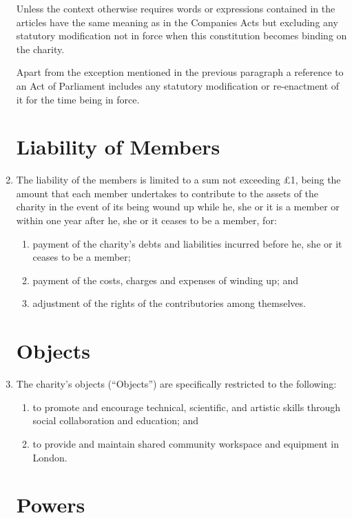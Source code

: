 \begin{enumerate}
  Unless the context otherwise requires words or expressions
  contained in the articles have the same meaning as in the Companies
  Acts but excluding any statutory modification not in force when
  this constitution becomes binding on the charity.

  Apart from the exception mentioned in the previous paragraph a
  reference to an Act of Parliament includes any statutory
  modification or re-enactment of it for the time being in force.

\section{Liability of Members}

\item
  The liability of the members is limited to a sum not exceeding £1,
  being the amount that each member undertakes to contribute to the
  assets of the charity in the event of its being wound up while he,
  she or it is a member or within one year after he, she or it ceases
  to be a member, for:
  \begin{enumerate}
  \item
    payment of the charity's debts and liabilities incurred before he,
    she or it ceases to be a member;
  \item
    payment of the costs, charges and expenses of winding up; and
  \item
    adjustment of the rights of the contributories among themselves.
  \end{enumerate}

\section{Objects}

\item
  The charity's objects (``Objects'') are specifically restricted to
  the following:
  \begin{enumerate}
  \item
    to promote and encourage technical, scientific, and artistic skills through social collaboration and education; and
  \item
    to provide and maintain shared community workspace and equipment in London.
  \end{enumerate}

\section{Powers}


\end{enumerate}
